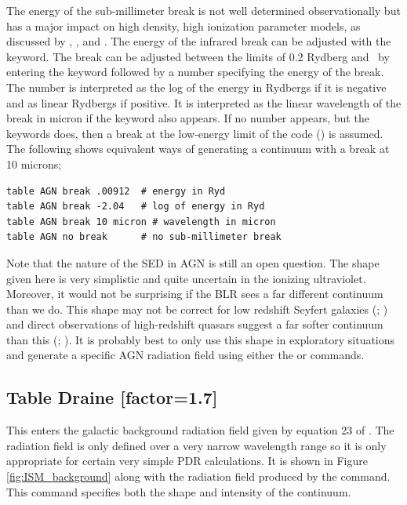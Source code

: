 The energy of the sub-millimeter break is not well determined
observationally but has a major impact on high density, high ionization
parameter models, as discussed by \citet{Ferland1989}, \citet{FerlandPeterson1992}, and \citet{Ferland1999a}.  The energy of the infrared break can be
adjusted with the  keyword.
The break can be adjusted between the
limits of 0.2 Rydberg and \emm\
by entering the keyword 
followed by a number specifying the energy of the break.  The number is
interpreted as the log of the energy in Rydbergs if it is negative and as
linear Rydbergs if positive.  It is interpreted as the linear wavelength
of the break in micron if the keyword \cdCommand{micron} also appears.
If no number appears, but the keywords \cdCommand{no break} does,
then a break at the low-energy
limit of the code (\emm ) is assumed.
The following shows
equivalent ways of generating a continuum with a break at 10 microns;
\begin{verbatim}
table AGN break .00912  # energy in Ryd
table AGN break -2.04   # log of energy in Ryd
table AGN break 10 micron # wavelength in micron
table AGN no break      # no sub-millimeter break
\end{verbatim}
Note that the nature of the SED in AGN is still an open question.  The
shape given here is very simplistic and quite uncertain in the
ionizing ultraviolet.  Moreover, it would not be surprising if the BLR
sees a far different continuum than we do.  This shape may not be
correct for low redshift Seyfert galaxies (\citealp{Binette1989};
\citealp{Clavel1990}) and direct observations of high-redshift quasars
suggest a far softer continuum than this (\citealp{Zheng1997};
\citealp{KoristaFerlandBaldwin1997}).
It is
probably best to only use this shape in exploratory situations and
generate a specific AGN radiation field using either the
 or  commands.

\subsection{Table Draine [factor=1.7]}

This enters the galactic background radiation field given by
equation 23 of \citet{Draine1996}.
The radiation field is only defined over a very
narrow wavelength range so it is only appropriate for
certain very simple PDR calculations.
It is shown in Figure \ref{fig:ISM_background} along with the
radiation field produced
by the  command.
This command specifies both the shape and
intensity of the continuum.

